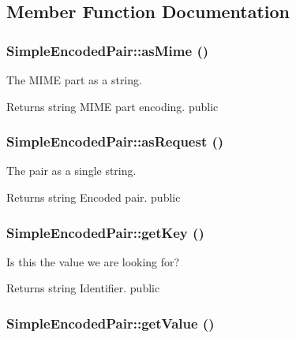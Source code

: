 \subsection{Member Function Documentation}
\hypertarget{class_simple_encoded_pair_a100d7af9df42a304dc7c2d7b21fe48ef}{
\subsubsection[{asMime}]{\setlength{\rightskip}{0pt plus 5cm}SimpleEncodedPair::asMime ()}}
\label{class_simple_encoded_pair_a100d7af9df42a304dc7c2d7b21fe48ef}
The MIME part as a string. \begin{DoxyReturn}{Returns}
string MIME part encoding.  public 
\end{DoxyReturn}
\hypertarget{class_simple_encoded_pair_a8ce3ce6d7a804ee6fcd343397ae8d567}{
\subsubsection[{asRequest}]{\setlength{\rightskip}{0pt plus 5cm}SimpleEncodedPair::asRequest ()}}
\label{class_simple_encoded_pair_a8ce3ce6d7a804ee6fcd343397ae8d567}
The pair as a single string. \begin{DoxyReturn}{Returns}
string Encoded pair.  public 
\end{DoxyReturn}
\hypertarget{class_simple_encoded_pair_ae28914274d76bc7e6ad9e41595f851e9}{
\subsubsection[{getKey}]{\setlength{\rightskip}{0pt plus 5cm}SimpleEncodedPair::getKey ()}}
\label{class_simple_encoded_pair_ae28914274d76bc7e6ad9e41595f851e9}
Is this the value we are looking for? \begin{DoxyReturn}{Returns}
string Identifier.  public 
\end{DoxyReturn}
\hypertarget{class_simple_encoded_pair_aa4061b82a5741fef9824ddaeb3ccfb9d}{
\subsubsection[{getValue}]{\setlength{\rightskip}{0pt plus 5cm}SimpleEncodedPair::getValue ()}}

